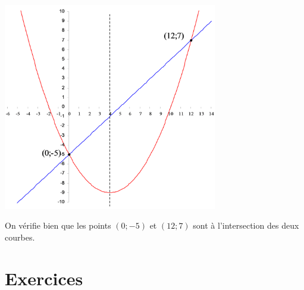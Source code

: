 \begin{exemple}
\begin{center}
\includegraphics[width = 0.7\textwidth]{systemquad/exemple1.png}
\end{center}
On vérifie bien que les points $(0;-5)$ et $(12;7)$ sont à l'intersection des deux courbes.
\end{exemple}

\section{Exercices}

